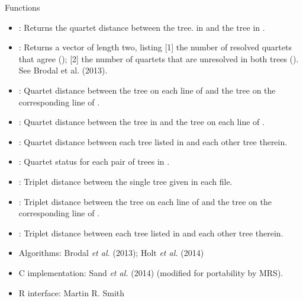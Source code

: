 \documentclass[a4paper]{book}
\begin{document}
%
\begin{Section}{Functions}
\begin{itemize}

\item {}: Returns the quartet distance between the tree.
in  and the tree in .

\item {}: Returns a vector of length two, listing [1]
the number of resolved quartets that agree ();
[2] the number of quartets that are unresolved in both trees ().
See Brodal et al. (2013).

\item {}: Quartet distance between the tree on each line of 
and the tree on the corresponding line of .

\item {}: Quartet distance between the tree in
 and the tree on each line of .

\item {}: Quartet distance between each tree listed in  and
each other tree therein.

\item {}: Quartet status for each pair of trees in .

\item {}: Triplet distance between the single tree given
in each file.

\item {}: Triplet distance between the tree on each line of 
and the tree on the corresponding line of .

\item {}: Triplet distance between each tree listed in  and
each other tree therein.

\end{itemize}
\end{Section}
%
\begin{Author}\relax
\begin{itemize}

\item Algorithms: Brodal \emph{et al.} (2013); Holt \emph{et al.} (2014)
\item C implementation: Sand \emph{et al.} (2014) (modified for portability by MRS).
\item R interface: Martin R. Smith

\end{itemize}

\end{Author}
\end{document}
